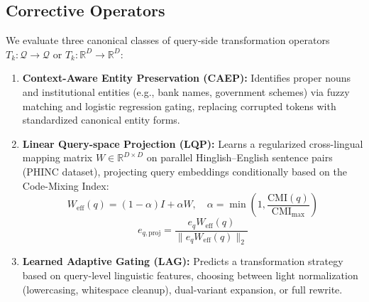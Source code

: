 \documentclass[conference]{IEEEtran}
\begin{document}
\subsection{Corrective Operators}
We evaluate three canonical classes of query-side transformation operators $T_k: \mathcal{Q} \to \mathcal{Q}$ or $T_k: \mathbb{R}^D \to \mathbb{R}^D$:
\begin{enumerate}
    \item \textbf{Context-Aware Entity Preservation (CAEP):} Identifies proper nouns and institutional entities (e.g., bank names, government schemes) via fuzzy matching and logistic regression gating, replacing corrupted tokens with standardized canonical entity forms.
    \item \textbf{Linear Query-space Projection (LQP):} Learns a regularized cross-lingual mapping matrix $W \in \mathbb{R}^{D \times D}$ on parallel Hinglish--English sentence pairs (PHINC dataset), projecting query embeddings conditionally based on the Code-Mixing Index:
    \begin{equation}
    W_{\text{eff}}(q) = (1 - \alpha) I + \alpha W, \quad \alpha = \min\left(1, \frac{\text{CMI}(q)}{\text{CMI}_{\max}}\right)
    \end{equation}
    \begin{equation}
    e_{q,\text{proj}} = \frac{e_q W_{\text{eff}}(q)}{\|e_q W_{\text{eff}}(q)\|_2}
    \end{equation}
    \item \textbf{Learned Adaptive Gating (LAG):} Predicts a transformation strategy based on query-level linguistic features, choosing between light normalization (lowercasing, whitespace cleanup), dual-variant expansion, or full rewrite.
\end{enumerate}
\end{document}
